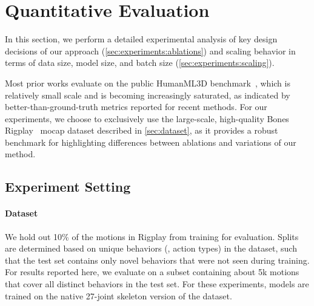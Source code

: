 \section{Quantitative Evaluation}
\label{sec:experiments}

In this section, we perform a detailed experimental analysis of key design decisions of our approach (\cref{sec:experiments:ablations}) and scaling behavior in terms of data size, model size, and batch size (\cref{sec:experiments:scaling}). 

Most prior works evaluate on the public HumanML3D benchmark~\cite{guo2022humanml3d}, which is relatively small scale and is becoming increasingly saturated, as indicated by better-than-ground-truth metrics reported for recent methods. 
For our experiments, we choose to exclusively use the large-scale, high-quality Bones Rigplay~\cite{bones_ai_datasets} mocap dataset described in \cref{sec:dataset}, as it provides a robust benchmark for highlighting differences between ablations and variations of our method.

\subsection{Experiment Setting}
\label{sec:experiments_setup}

\paragraph{Dataset}
We hold out 10\% of the motions in Rigplay from training for evaluation. 
Splits are determined based on unique behaviors (\ie, action types) in the dataset, such that the test set contains only novel behaviors that were not seen during training. 
For results reported here, we evaluate on a subset containing about 5k motions that cover all distinct behaviors in the test set. 
For these experiments, models are trained on the native 27-joint skeleton version of the dataset.

